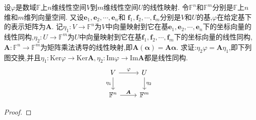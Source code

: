 \documentclass[lang=cn,newtx,10pt,scheme=chinese]{elegantbook}
\begin{document}
\begin{theorem}\label{theorem:线性映射与矩阵基本定理}
设\(\varphi\)是数域\(\mathbb{F}\)上\(n\)维线性空间\(V\)到\(m\)维线性空间\(U\)的线性映射. 令\(\mathbb{F}^n\)和\(\mathbb{F}^m\)分别是\(\mathbb{F}\)上\(n\)维和\(m\)维列向量空间. 又设\(\boldsymbol{e}_1,\boldsymbol{e}_2,\cdots,\boldsymbol{e}_n\)和
\(\boldsymbol{f}_1,\boldsymbol{f}_2,\cdots,\boldsymbol{f}_m\)分别是\(V\)和\(U\)的基,\(\varphi\)在给定基下的表示矩阵为\(\boldsymbol{A}\). 记\(\eta_1:V\to\mathbb{F}^n\)为\(V\)中向量映射到它在基\(\boldsymbol{e}_1,\boldsymbol{e}_2,\cdots,\boldsymbol{e}_n\)下的坐标向量的线性同构,\(\eta_2:U\to\mathbb{F}^m\)为\(U\)中向量映射到它在基\(\boldsymbol{f}_1,\boldsymbol{f}_2,\cdots,\boldsymbol{f}_m\)下的坐标向量的线性同构,\(\boldsymbol{A}:\mathbb{F}^n\to\mathbb{F}^m\)为矩阵乘法诱导的线性映射,即\(\boldsymbol{A}(\boldsymbol{\alpha})=\boldsymbol{A}\boldsymbol{\alpha}\). 求证:\(\eta_2\varphi=\boldsymbol{A}\eta_1\),即下列图交换,并且\(\eta_1:\text{Ker}\varphi\to\text{Ker}\boldsymbol{A},\eta_2:\text{Im}\varphi\to\text{Im}\boldsymbol{A}\)都是线性同构.
\[\begin{tikzcd}
    V \arrow[r, "\varphi"] \arrow[d, "\eta_1"'] & U \arrow[d, "\eta_2"] \\
    \mathbb{F}^n \arrow[r, "\boldsymbol{A}"]    & \mathbb{F}^m         
\end{tikzcd}
\]
\end{theorem}
\begin{proof}
    
\end{proof}
\end{document}
